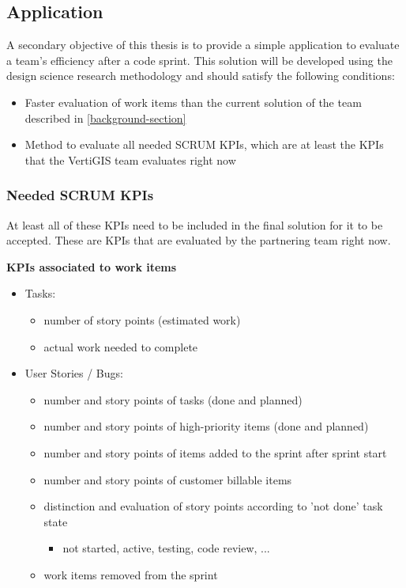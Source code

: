 \subsection{Application}
A secondary objective of this thesis is to provide a simple application to evaluate a team's efficiency after a code sprint. 
This solution will be developed using the design science research methodology and should satisfy the following conditions:

\begin{itemize}
    \item Faster evaluation of work items than the current 
    solution of the team described in \ref{background-section}
    \item Method to evaluate all needed SCRUM KPIs, which are at least the KPIs that the VertiGIS team evaluates right now
\end{itemize}

\subsubsection{Needed SCRUM KPIs}

At least all of these KPIs need to be included in the final solution for it to be accepted. 
These are KPIs that are evaluated by the partnering team right now.

\textbf{KPIs associated to work items}

\begin{itemize}
    \item Tasks:
    \begin{itemize}
        \item number of story points (estimated work)
        \item actual work needed to complete
    \end{itemize}
    \item User Stories / Bugs:
    \begin{itemize}
        \item number and story points of tasks (done and planned)
        \item number and story points of high-priority items (done and planned)
        \item number and story points of items added to the sprint after sprint start
        \item number and story points of customer billable items
        \item distinction and evaluation of story points according to 'not done' task state
        \begin{itemize}
            \item not started, active, testing, code review, ...
        \end{itemize}
        \item work items removed from the sprint
    \end{itemize}
\end{itemize}

